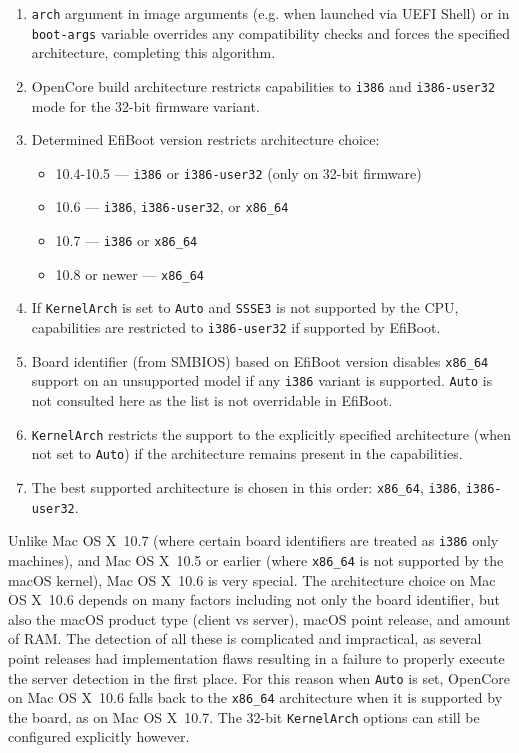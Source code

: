 \documentclass[]{article}
\providecommand{\tightlist}{%
  \setlength{\itemsep}{0pt}\setlength{\parskip}{0pt}}
\begin{document}
\begin{enumerate}
  \begin{enumerate}
    \tightlist
    \item \texttt{arch} argument in image arguments (e.g. when launched
    via UEFI Shell) or in \texttt{boot-args} variable overrides any compatibility
    checks and forces the specified architecture, completing this algorithm.
    \item OpenCore build architecture restricts capabilities to \texttt{i386}
      and \texttt{i386-user32} mode for the 32-bit firmware variant.
    \item Determined EfiBoot version restricts architecture choice:
      \begin{itemize}
      \item 10.4-10.5 --- \texttt{i386} or \texttt{i386-user32} (only on 32-bit firmware)
      \item 10.6 --- \texttt{i386}, \texttt{i386-user32}, or \texttt{x86\_64}
      \item 10.7 --- \texttt{i386} or \texttt{x86\_64}
      \item 10.8 or newer --- \texttt{x86\_64}
      \end{itemize}
    \item If \texttt{KernelArch} is set to \texttt{Auto} and \texttt{SSSE3}
      is not supported by the CPU, capabilities are restricted to \texttt{i386-user32}
      if supported by EfiBoot.
    \item Board identifier (from SMBIOS) based on EfiBoot version
      disables \texttt{x86\_64} support on an unsupported model
      if any \texttt{i386} variant is supported. \texttt{Auto}
      is not consulted here as the list is not overridable in EfiBoot.
    \item \texttt{KernelArch} restricts the support to the explicitly
      specified architecture (when not set to \texttt{Auto}) if
      the architecture remains present in the capabilities.
    \item The best supported architecture is chosen in this order:
      \texttt{x86\_64}, \texttt{i386}, \texttt{i386-user32}.
  \end{enumerate}

  Unlike Mac OS X~10.7 (where certain board identifiers are treated as \texttt{i386}
  only machines), and Mac OS X~10.5 or earlier (where \texttt{x86\_64} is not supported
  by the macOS kernel), Mac OS X~10.6 is very special. The architecture choice on Mac OS X~10.6
  depends on many factors including not only the board identifier, but also the macOS
  product type (client vs server), macOS point release, and amount of RAM. The detection
  of all these is complicated and impractical, as several point releases had implementation
  flaws resulting in a failure to properly execute the server detection in the first place.
  For this reason when \texttt{Auto} is set, OpenCore on Mac OS X~10.6 falls back
  to the \texttt{x86\_64} architecture when it is supported by the board, as
  on Mac OS X~10.7. The 32-bit \texttt{KernelArch} options can still be configured
  explicitly however.


\end{enumerate}
\end{document}
